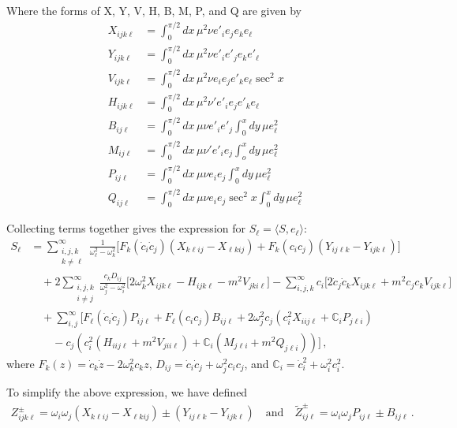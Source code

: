 \documentclass[letterpaper,11pt]{article}
\newcommand{\oi}{\omega_i}
\newcommand{\oj}{\omega_j}
\newcommand{\ok}{\omega_k}
\newcommand{\ol}{\omega_\ell}
\begin{document}
Where the forms of X, Y, V, H, B, M, P, and Q are given by
\begin{align}
X_{ijk\ell} &= \int^{\pi/2}_0 dx \, \mu^2 \nu e'_i e_j e_k e_\ell \\
Y_{ijk\ell} &= \int^{\pi/2}_0 dx \, \mu^2 \nu e'_i e'_j e_k e'_\ell \\
V_{ijk\ell} &= \int^{\pi/2}_0 dx \, \mu^2 \nu e_i e_j e'_k e_\ell \sec^2 x \\
H_{ijk\ell} &= \int^{\pi/2}_0 dx \, \mu^2 \nu' e'_i e_j e'_k e_\ell \\
B_{ij\ell} &= \int^{\pi/2}_0 dx \, \mu \nu e'_i e'_j \int^x_0 dy \, \mu e^2_\ell \\
M_{ij\ell} &= \int^{\pi/2}_0 dx \, \mu \nu' e'_i e_j \int^x_o dy \, \mu e_\ell^2 \\
P_{ij\ell} &= \int^{\pi/2}_0 dx \, \mu \nu e_i e_j \int^x_0 dy \, \mu e^2_\ell \\
Q_{ij\ell} &= \int^{\pi/2}_0 dx \, \mu \nu e_i e_j \sec^2 x \int^x_0 dy \, \mu e^2_\ell
\end{align}

Collecting terms together gives the expression for $S_\ell = \langle S, e_\ell \rangle$:
\begin{align}
S_\ell &= \sum_{\substack{i, j, k \\ k \neq \ell}}^\infty \frac{1}{\ol^2 - \ok^2} \Big[ F_k(\dot c_i \dot c_j) \left(X_{k\ell i j} - X_{\ell k i j} \right) + F_k(c_i c_j) \left(Y_{ij\ell k} - Y_{ijk\ell} \right) \Big] \nonumber \\
%
& \quad +2 \sum_{\substack{i,j,k \\ i \neq j}}^\infty \frac{c_k D_{ij}}{\oj^2 - \oi^2} \Big[  2\ok^2 X_{ijk\ell} - H_{ijk\ell} -m^2 V_{jki\ell} \Big] - \sum_{i,j,k}^\infty c_i \Big[ 2 \dot c_j \dot c_k X_{ijk\ell} + m^2 c_j c_k V_{ijk\ell} \Big] \nonumber \\ 
%
& \quad + \sum_{i,j}^\infty \Big[ F_\ell (\dot c_i \dot c_j) P_{ij\ell} + F_\ell (c_i c_j) B_{ij\ell} + 2\oj^2 c_j \left( c_i^2 X_{iij\ell} + \mathbb C_i P_{j\ell i} \right) \nonumber \\
%
& \qquad - c_j \left( c^2_i (H_{iij\ell} + m^2 V_{jii\ell} ) + \mathbb C_i (M_{j\ell i} + m^2 Q_{j\ell i}) \right) \Big] \, ,
\end{align}
where $F_k(z) = \dot c_k \dot z - 2\ok^2 c_k z$, $D_{ij} = \dot c_i \dot c_j + \omega^2_j c_i c_j$, and $\mathbb C_i = \dot c_i^2 + \oi^2 c_i^2$.

To simplify the above expression, we have defined
\begin{align}
Z^{\pm}_{ijk\ell} = \oi \oj \left( X_{k\ell ij} - X_{\ell kij} \right) \pm \left( Y_{ij\ell k} - Y_{ijk\ell} \right) \quad \text{and} \quad \tilde Z^{\pm}_{ij\ell} = \oi \oj P_{ij\ell} \pm B_{ij\ell} \, .
\end{align}
\end{document}

